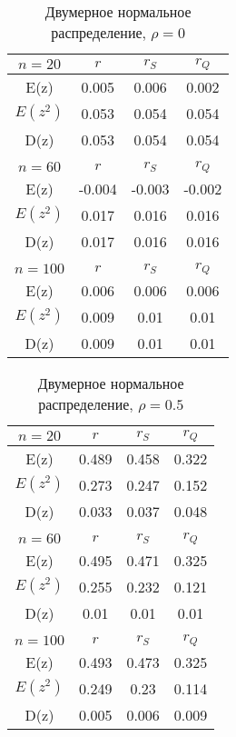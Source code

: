 \begin{table}
\begin{center}
\begin{tabular}{|c|c|c|c|}
	\hline
	$n = 20$ & $r$ & $r_S$ & $r_Q$ \\
	\hline
    E(z) & 0.005 & 0.006 & 0.002 \\
	\hline
    $E(z^2)$ & 0.053 & 0.054 & 0.054\\
	\hline
    D(z) & 0.053 & 0.054 & 0.054\\
	\hline
	&  &  & \\
	\hline
    $n = 60$ & $r$ & $r_S$ & $r_Q$\\
	\hline
    E(z) & -0.004 & -0.003 & -0.002\\
	\hline
    $E(z^2)$ & 0.017 & 0.016 & 0.016\\
	\hline
    D(z) & 0.017 & 0.016 & 0.016 \\
	\hline
	& & & \\
	\hline
	$n = 100$ & $r$ & $r_S$ & $r_Q$\\
	\hline
    E(z) & 0.006 & 0.006 & 0.006 \\
	\hline
    $E(z^2)$ & 0.009 & 0.01 & 0.01\\
	\hline
    D(z) & 0.009 & 0.01 & 0.01\\
	\hline
\end{tabular}
\end{center}
\caption{Двумерное нормальное распределение, $\rho = 0$}\label{tab:rho0}
\end{table} 
\begin{table}
\begin{center}
\begin{tabular}{|c|c|c|c|}
	\hline
	$n = 20$ & $r$ & $r_S$ & $r_Q$ \\
	\hline
    E(z) & 0.489 & 0.458 & 0.322 \\
	\hline
    $E(z^2)$ &  0.273 & 0.247 & 0.152\\
	\hline
    D(z) & 0.033 & 0.037 & 0.048\\
	\hline
	&  &  & \\
	\hline
    $n = 60$ & $r$ & $r_S$ & $r_Q$\\
	\hline
    E(z) & 0.495 & 0.471 & 0.325\\
	\hline
    $E(z^2)$ & 0.255 & 0.232 & 0.121\\
	\hline
    D(z) &  0.01 & 0.01 & 0.01 \\
	\hline
	& & & \\
	\hline
	$n = 100$ & $r$ & $r_S$ & $r_Q$\\
	\hline
    E(z) & 0.493 & 0.473 & 0.325\\
	\hline
    $E(z^2)$ & 0.249 & 0.23 & 0.114\\
	\hline
    D(z) & 0.005 & 0.006 & 0.009\\
	\hline
\end{tabular}
\end{center}
\caption{Двумерное нормальное распределение, $\rho = 0.5$}\label{tab:rho0.5}
\end{table}
